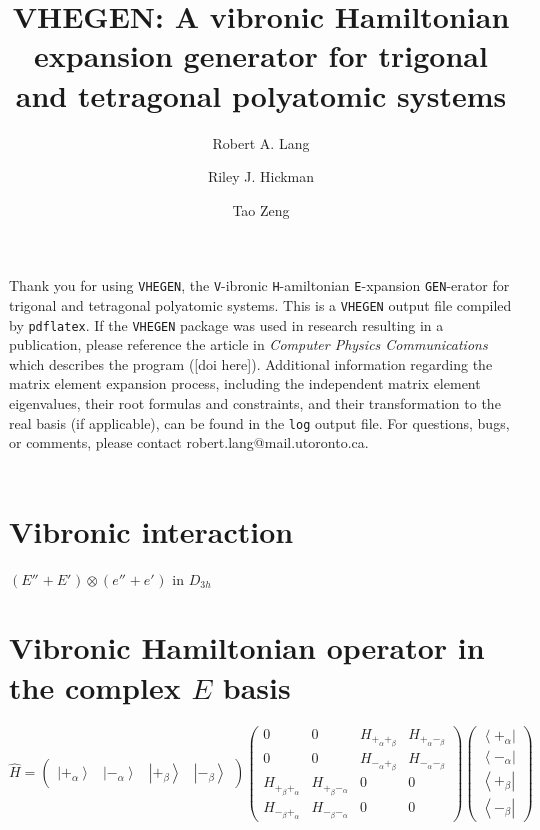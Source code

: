 \documentclass[fleqn]{article}
\title{VHEGEN: A vibronic Hamiltonian expansion generator for trigonal and tetragonal polyatomic systems}
\author{Robert A. Lang \and Riley J. Hickman \and Tao Zeng}
\date{}
\begin{document}
\maketitle
Thank you for using \texttt{VHEGEN}, the \texttt{V}-ibronic \texttt{H}-amiltonian \texttt{E}-xpansion \texttt{GEN}-erator for trigonal and tetragonal polyatomic systems. This is a \texttt{VHEGEN} output file compiled by \texttt{pdflatex}. If the \texttt{VHEGEN} package was used in research resulting in a publication, please reference the article in \textit{Computer Physics Communications} which describes the program ([doi here]). Additional information regarding the matrix element expansion process, including the independent matrix element eigenvalues, their root formulas and constraints, and their transformation to the real basis (if applicable), can be found in the \texttt{log} output file. For questions, bugs, or comments, please contact robert.lang@mail.utoronto.ca.\\\\
\tableofcontents
\newpage
\section{Vibronic interaction}
$(E''_{}+E'_{}) \otimes (e''_{}+e'_{})$ in $D_{3h}$
\section{Vibronic Hamiltonian operator in the complex $E$ basis}
$\hat{H}=\left(\begin{matrix}{\left|+_\alpha\right\rangle } & {\left|-_\alpha\right\rangle } & {\left|+_\beta\right\rangle } & {\left|-_\beta\right\rangle }\end{matrix}\right) \left(\begin{matrix}0 & 0 & H_{+_{\alpha}+_{\beta}} & H_{+_{\alpha}-_{\beta}}\\0 & 0 & H_{-_{\alpha}+_{\beta}} & H_{-_{\alpha}-_{\beta}}\\H_{+_{\beta}+_{\alpha}} & H_{+_{\beta}-_{\alpha}} & 0 & 0\\H_{-_{\beta}+_{\alpha}} & H_{-_{\beta}-_{\alpha}} & 0 & 0\end{matrix}\right) \left(\begin{matrix}{\left\langle +_\alpha\right|}\\{\left\langle -_\alpha\right|}\\{\left\langle +_\beta\right|}\\{\left\langle -_\beta\right|}\end{matrix}\right)$
\end{document}
